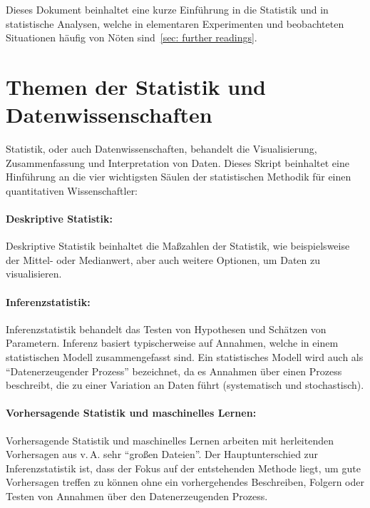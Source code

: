 \documentclass[a4paper,twoside]{tufte-book}\usepackage[]{graphicx}\usepackage[]{color}
\begin{document}
	Dieses Dokument beinhaltet eine kurze Einführung in die Statistik und in statistische Analysen, welche in elementaren Experimenten und beobachteten Situationen häufig von Nöten sind~\ref{sec: further readings}.
	
	\section{Themen der Statistik und Datenwissenschaften}
	Statistik, oder auch Datenwissenschaften, behandelt die Visualisierung, Zusammenfassung und Interpretation von Daten. Dieses Skript beinhaltet eine Hinführung an die vier wichtigsten Säulen der statistischen Methodik für einen quantitativen Wissenschaftler:
	
	\paragraph{Deskriptive Statistik:} Deskriptive Statistik beinhaltet die Maßzahlen der Statistik, wie beispielsweise der Mittel- oder Medianwert, aber auch weitere Optionen, um Daten zu visualisieren.
	
	\paragraph{Inferenzstatistik:} Inferenzstatistik behandelt das Testen von Hypothesen und Schätzen von Parametern. Inferenz basiert typischerweise auf Annahmen, welche in einem statistischen Modell zusammengefasst sind. Ein statistisches Modell wird auch als "`Datenerzeugender Prozess"' bezeichnet, da es Annahmen über einen Prozess beschreibt, die zu einer Variation an Daten führt (systematisch und stochastisch).
	
	\paragraph{Vorhersagende Statistik und maschinelles Lernen:} Vorhersagende Statistik und maschinelles Lernen arbeiten mit herleitenden Vorhersagen aus v.\,A. sehr "`großen Dateien"'. Der Hauptunterschied zur Inferenzstatistik ist, dass der Fokus auf der entstehenden Methode liegt, um gute Vorhersagen treffen zu können ohne ein vorhergehendes Beschreiben, Folgern oder Testen von Annahmen über den Datenerzeugenden Prozess.
	
\end{document}
